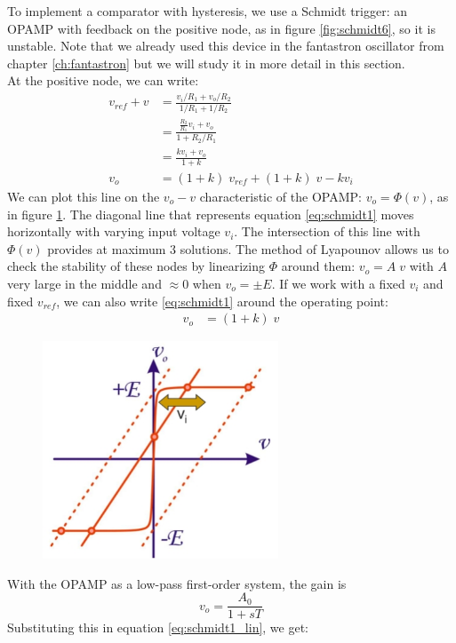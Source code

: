 To implement a comparator with hysteresis, we use a Schmidt trigger: an OPAMP with feedback on the positive node, as in figure \ref{fig:schmidt6}, so it is unstable. Note that we already used this device in the fantastron oscillator from chapter \ref{ch:fantastron} but we will study it in more detail in this section.\\
At the positive node, we can write:
\begin{align}
	v_{ref} + v &= \frac{v_i/R_1 + v_o/R_2}{1/R_1 + 1/R_2}\\
				&= \frac{\frac{R_2}{R_1} v_i + v_o}{1 + R_2/R_1} \\
				&= \frac{k v_i + v_o}{1+k} \\
	v_o &= (1+k) \; v_{ref} + (1+k) \; v - k v_i
	\label{eq:schmidt1}
\end{align}
We can plot this line on the $v_o - v$ characteristic of the OPAMP: $v_o = \Phi(v)$, as in figure \ref{fig:schmidt7}. The diagonal line that represents equation \ref{eq:schmidt1} moves horizontally with varying input voltage $v_i$. The intersection of this line with $\Phi(v)$ provides at maximum $3$ solutions. The method of Lyapounov allows us to check the stability of these nodes by linearizing $\Phi$ around them: $v_o = A \; v$ with $A$ very large in the middle and $\approx 0$ when $v_o = \pm E$. If we work with a fixed $v_i$ and fixed $v_{ref}$, we can also write \ref{eq:schmidt1} around the operating point:
\begin{align}
	v_o &= (1+k) \; v
	\label{eq:schmidt1_lin}
\end{align}
\begin{figure}[h!]
	\centering
	\includegraphics[width=7cm]{figures/ch15/schmidt7.jpg}
	\caption{}
	\label{fig:schmidt7}
\end{figure}
With the OPAMP as a low-pass first-order system, the gain is 
$$v_o = \frac{A_0}{1 + sT}$$
Substituting this in equation \ref{eq:schmidt1_lin}, we get:
